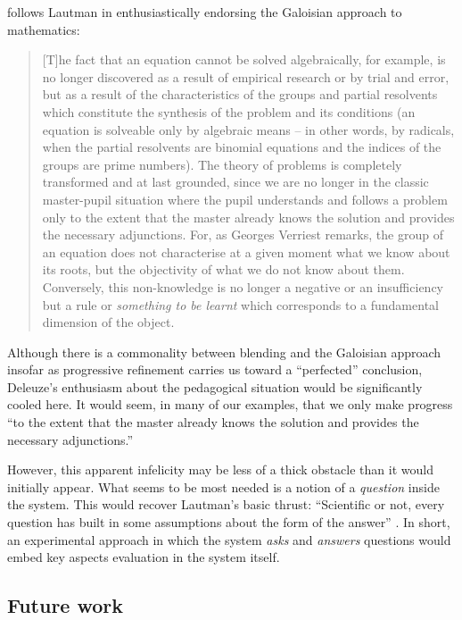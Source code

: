 \cite[pp. 227--228]{deleuze1994difference} follows
Lautman in enthusiastically endorsing the Galoisian approach to
mathematics:
\begin{quote}
[T]he fact that an equation cannot be solved algebraically, for
example, is no longer discovered as a result of empirical research or
by trial and error, but as a result of the characteristics of the
groups and partial resolvents which constitute the synthesis of the
problem and its conditions (an equation is solveable only by algebraic
means -- in other words, by radicals, when the partial resolvents are
binomial equations and the indices of the groups are prime numbers).
The theory of problems is completely transformed and at last grounded,
since we are no longer in the classic master-pupil situation where the
pupil understands and follows a problem only to the extent that the
master already knows the solution and provides the necessary
adjunctions.  For, as Georges Verriest remarks, the group of an
equation does not characterise at a given moment what we know about
its roots, but the objectivity of what we do not know about them.
Conversely, this non-knowledge is no longer a negative or an
insufficiency but a rule or \emph{something to be learnt} which
corresponds to a fundamental dimension of the object.
\end{quote}

Although there is a commonality between blending and the
Galoisian approach insofar as progressive refinement carries us toward a
``perfected'' conclusion, Deleuze's enthusiasm about the pedagogical
situation would be significantly cooled here.  It would seem, in many
of our examples, that we only make progress ``to the extent that the
master already knows the solution and provides the necessary
adjunctions.''

However, this apparent infelicity may be less of a thick obstacle than
it would initially appear.  What seems to be most needed is a notion of a \emph{question} inside the system.  This would recover Lautman's basic
thrust: ``Scientific or not, every question has built in some
assumptions about the form of the answer'' \cite{larvor2011albert}.
In short, an experimental approach in which the system \emph{asks}
and \emph{answers} questions would embed key aspects evaluation in the system itself.

\subsection{Future work}

